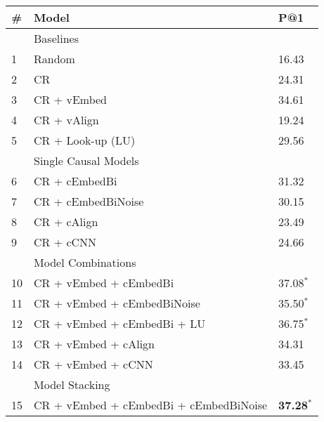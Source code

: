 


\begin{table}[t!]
\begin{center}
\begin{footnotesize}
\begin{tabular}{lll}
\hline
\# & Model & P@1 \\ 
\hline
& Baselines & \\
\hline
1	&	Random 				& 16.43 	\\
2	&	CR					& 24.31	\\
3	&	CR + vEmbed 			& 34.61	\\
4	&	CR + vAlign			& 19.24	\\
5	&	CR + Look-up	 (LU)	& 29.56 	\\
\hline
& Single Causal Models 		& \\
\hline
6	&	CR + cEmbedBi       & 31.32\\
7	&	CR + cEmbedBiNoise  & 30.15 \\ 
8	&	CR + cAlign  		& 23.49 \\
9	&	CR + cCNN  			& 24.66	\\
\hline
& Model Combinations & \\
\hline
10	&	CR + vEmbed + cEmbedBi		& 37.08$^{*}$	\\ %
11	& 	CR + vEmbed + cEmbedBiNoise 	& 35.50$^*$	\\ %
12	&	CR + vEmbed + cEmbedBi + LU	& 36.75$^{*}$	\\ %
13	&	CR + vEmbed + cAlign		& 	34.31 	\\ %
14	&	CR + vEmbed + cCNN		& 	33.45 \\
\hline
& Model Stacking & \\
\hline
15	& 	CR + vEmbed + cEmbedBi + cEmbedBiNoise 	& {\bf 37.28$^{*}$}	\\ 


\end{tabular}
\end{footnotesize}
\end{center}
\end{table}
